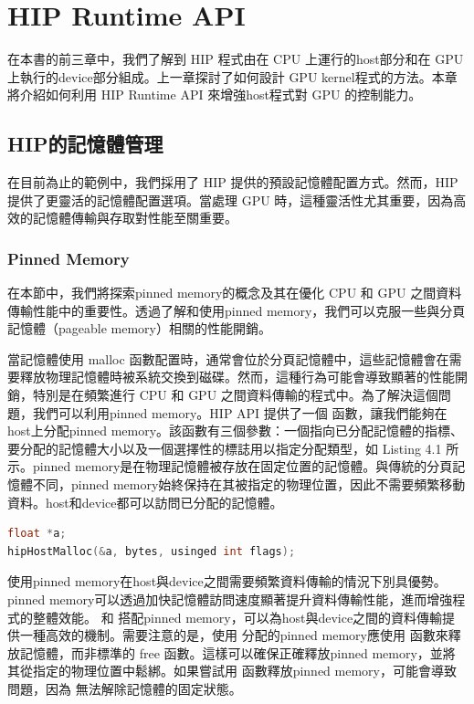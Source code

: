 \chapter{HIP Runtime API} \label{chap:HIP_runtime_API}

在本書的前三章中，我們了解到 HIP 程式由在 CPU 上運行的host部分和在 GPU 上執行的device部分組成。上一章探討了如何設計 GPU kernel程式的方法。本章將介紹如何利用 HIP Runtime API 來增強host程式對 GPU 的控制能力。

\section{HIP的記憶體管理}
在目前為止的範例中，我們採用了 HIP 提供的預設記憶體配置方式。然而，HIP 提供了更靈活的記憶體配置選項。當處理 GPU 時，這種靈活性尤其重要，因為高效的記憶體傳輸與存取對性能至關重要。

\subsection{Pinned Memory}
在本節中，我們將探索pinned memory的概念及其在優化 CPU 和 GPU 之間資料傳輸性能中的重要性。透過了解和使用pinned memory，我們可以克服一些與分頁記憶體（pageable memory）相關的性能開銷。

當記憶體使用 malloc 函數配置時，通常會位於分頁記憶體中，這些記憶體會在需要釋放物理記憶體時被系統交換到磁碟。然而，這種行為可能會導致顯著的性能開銷，特別是在頻繁進行 CPU 和 GPU 之間資料傳輸的程式中。為了解決這個問題，我們可以利用pinned memory。HIP API 提供了一個  函數，讓我們能夠在host上分配pinned memory。該函數有三個參數：一個指向已分配記憶體的指標、要分配的記憶體大小以及一個選擇性的標誌用以指定分配類型，如 Listing 4.1 所示。pinned memory是在物理記憶體被存放在固定位置的記憶體。與傳統的分頁記憶體不同，pinned memory始終保持在其被指定的物理位置，因此不需要頻繁移動資料。host和device都可以訪問已分配的記憶體。

\begin{lstlisting}[language=C, caption={在HIP中使用pinned memory進行記憶體配置}, label={1st:example}]
float *a;
hipHostMalloc(&a, bytes, usinged int flags);
\end{lstlisting}

使用pinned memory在host與device之間需要頻繁資料傳輸的情況下別具優勢。pinned memory可以透過加快記憶體訪問速度顯著提升資料傳輸性能，進而增強程式的整體效能。 和  搭配pinned memory，可以為host與device之間的資料傳輸提供一種高效的機制。需要注意的是，使用  分配的pinned memory應使用  函數來釋放記憶體，而非標準的 free 函數。這樣可以確保正確釋放pinned memory，並將其從指定的物理位置中鬆綁。如果嘗試用  函數釋放pinned memory，可能會導致問題，因為  無法解除記憶體的固定狀態。

